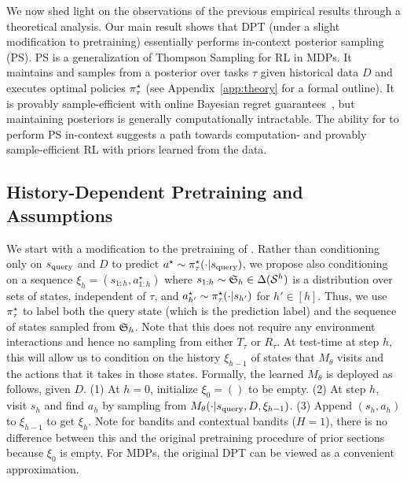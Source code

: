 We now shed light on the observations of the previous empirical results through a theoretical analysis. Our main result shows that DPT (under a slight modification to pretraining) essentially performs in-context posterior sampling (PS). PS is a generalization of Thompson Sampling for RL in MDPs. It maintains and samples from a posterior over tasks $\tau$ given historical data $D$ and executes optimal policies $\pi^{\star}_\tau$ (see Appendix~\ref{app:theory} for a formal outline). It is provably sample-efficient with online Bayesian regret guarantees~\citep{osband2013more}, but maintaining posteriors is generally computationally intractable. The ability for \macroName{} to perform PS in-context suggests a path towards computation- and provably sample-efficient RL with priors learned from the data.

\subsection{History-Dependent Pretraining and Assumptions}

We start with a modification to the pretraining of \macroName{}. Rather than conditioning only on $s_{\text{query}}$ and $D$ to predict $a^\star \sim \pi^{\star}_\tau(\cdot | s_{\text{query}})$, we propose also conditioning on a sequence $\xi_{h} = (s_{1:h}, a_{1:h}^\star)$ where $s_{1:h} \sim {\mathfrak{S}}_h \in \Delta({\mathcal{S}}^h)$ is a distribution over sets of states, independent of $\tau$, and $a^\star_{h'} \sim \pi^{\star}_\tau(\cdot | s_{h'})$ for $h ' \in [h]$. Thus, we use $\pi^{\star}_\tau$ to label both the query state (which is the prediction label) and the sequence of states sampled from ${\mathfrak{S}}_h$. Note that this does not require any environment interactions and hence no sampling from either $T_\tau$ or $R_\tau$.
At test-time at step $h$, this will allow us to condition on the history $\xi_{h - 1}$ of states that $M_{\theta}$ visits and the actions that it takes in those states. Formally, the learned $M_{\theta}$ is deployed as follows, given $D$.
    (1) At $h = 0$, initialize $\xi_0 = ()$ to be empty.
    (2) At step $h$, visit $s_h$ and find $a_h$ by sampling from  $M_{\theta}(\cdot | s_{\text{query}}, D, \xi_{h- 1})$.
    (3) Append $(s_h, a_h)$ to $\xi_{h -1}$ to get $\xi_h$.
Note for bandits and contextual bandits ($H = 1$), there is no difference between this and the original pretraining procedure of prior sections because $\xi_0$ is empty. For MDPs, the original DPT can be viewed as a convenient approximation.

